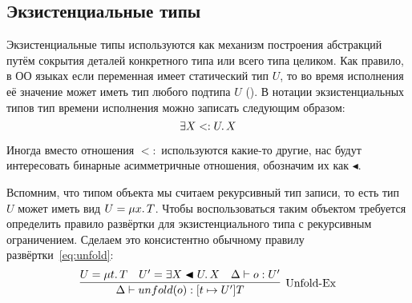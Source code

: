 \subsection{Экзистенциальные типы} \label{subsec:existentials}

Экзистенциальные типы используются как механизм построения абстракций путём сокрытия деталей конкретного типа или всего типа целиком.
Как правило, в ОО языках если переменная имеет статический тип $U$, то во время исполнения её значение может иметь тип любого подтипа $U$ ().
В нотации экзистенциальных типов тип времени исполнения можно записать следующим образом:
\[
    \exists X <: U \ldotp X
\]

Иногда вместо отношения $<:$ используются какие-то другие, нас будут интересовать бинарные асимметричные отношения, обозначим их как $\blacktriangleleft$.

Вспомним, что типом объекта мы считаем рекурсивный тип записи, то есть тип $U$ может иметь вид $U = \mu x \ldotp T$.
Чтобы воспользоваться таким объектом требуется определить правило развёртки для экзистенциального типа с рекурсивным ограничением.
Сделаем это консистентно обычному правилу развёртки~\eqref{eq:unfold}:
\begin{equation}
    \label{eq:unfold-ex}
    \infer[\text{Unfold-Ex}]{
        \Delta \vdash unfold(o) : [t \mapsto U']T
    }{
        U = \mu t \ldotp T
        &
        U' = \exists X \blacktriangleleft U \ldotp X
        &
        \Delta \vdash o : U'
    }
\end{equation}
